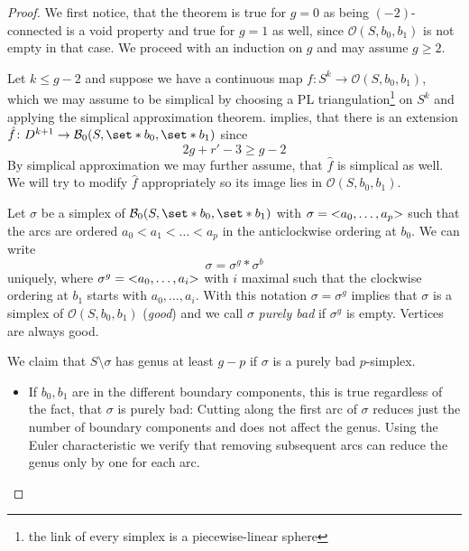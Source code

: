 \connectivity*
\begin{proof}
	We first notice, that the theorem is true for $g=0$ as being $(-2)$-connected is a void property and true for $g=1$ as well, since $\mathcal{O}(S,b_0,b_1)$ is not empty in that case.
	We proceed with an induction on $g$ and may assume $g\ge 2$.
	
	Let $k \le g-2$ and suppose we have a continuous map $f \colon S^k \to \mathcal{O}(S,b_0,b_1)$, which we may assume to be simplical by choosing a PL triangulation\footnote{the link of every simplex is a piecewise-linear sphere} on $S^k$ and applying the simplical approximation theorem.
	 implies, that there is an extension $\hat{f} \colon D^{k+1} \to \mathcal{B}_0(S,\set*{b_0},\set*{b_1})$ since 
	\[
		2g + r' -3 \ge g-2
	\]
	By simplical approximation we may further assume, that $\hat{f}$ is simplical as well.
	We will try to modify $\hat{f}$ appropriately so its image lies in $\mathcal{O}(S,b_0,b_1)$.
	
	Let $\sigma$ be a simplex of $\mathcal{B}_0(S,\set*{b_0},\set*{b_1})$ with $\sigma = \lenbrace{a_0, \ldots , a_p}$ such that the arcs are ordered $a_0 < a_1 < \ldots < a_p$ in the anticlockwise ordering at $b_0$.
	We can write 
	\[
		\sigma = \sigma^g * \sigma^b
	\]
	uniquely, where $\sigma^g = \lenbrace{a_0, \ldots ,a_i}$ with $i$ maximal such that the clockwise ordering at $b_1$ starts with $a_0, \ldots , a_i$.
	With this notation $\sigma = \sigma^g$ implies that $\sigma$ is a simplex of $\mathcal{O}(S,b_0,b_1)$ (\emph{good}) and we call $\sigma$ \emph{purely bad} if $\sigma^g$ is empty.
	Vertices are always good.
	
	We claim that $S\setminus \sigma$ has genus at least $g-p$ if $\sigma$ is a purely bad $p$-simplex.
	\begin{itemize}[itemsep=0pt]
		\item If $b_0,b_1$ are in the different boundary components, this is true regardless of the fact, that $\sigma$ is purely bad:
		Cutting along the first arc of $\sigma$ reduces just the number of boundary components and does not affect the genus.
		Using the Euler characteristic we verify that removing subsequent arcs can reduce the genus only by one for each arc. 
		

\end{itemize}
\end{proof}
